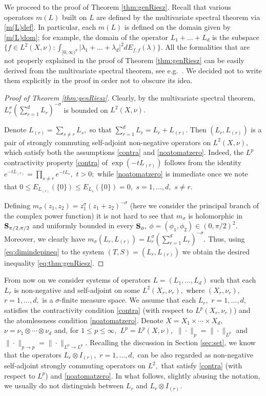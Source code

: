 \documentclass[leqno,12pt]{amsart}
\theoremstyle{definition}
\theoremstyle{remark}
\begin{document}
        We proceed to the proof of Theorem \ref{thm:genRiesz}. Recall that various operators $m(L)$ built on $L$ are defined by the multivariate spectral theorem via \eqref{m(L)def}. In particular, each $m(L)$ is defined on the domain given by \eqref{m(L)dom}; for example, the domain of the operator $L_1+\ldots +L_d$ is the subspace
         $\{f\in L^2(X,\nu)\colon \int_{[0,\infty)^d}|{\lambda}_1+\ldots+{\lambda}_d|^2 dE_{f,f}({\lambda})\}.$
         All the formalities that are not properly explained in the proof of Theorem \ref{thm:genRiesz} can be easily derived from the multivariate spectral theorem, see e.g.\ \cite[Theorem 4.16]{schmu:dgen}. We decided not to write them explicitly in the proof in order not to obscure its idea.
        \begin{proof}[Proof of Theorem \ref{thm:genRiesz}]
        Clearly, by the multivariate spectral theorem, $L_r^{\sigma}(\sum_{r=1}^d L_r)^{-\sigma}$ is bounded on $L^2(X,\nu).$

        Denote $L_{(r)}=\sum_{s\neq r} L_s,$ so that $\sum_{r=1}^d L_r=L_r+L_{(r)}.$ Then $(L_r,L_{(r)})$ is a pair of strongly commuting self-adjoint non-negative operators on $L^2(X,\nu),$ which satisfy both the assumptions \eqref{contra} and \eqref{noatomatzero}. Indeed, the $L^p$ contractivity property \eqref{contra} of $\exp(-tL_{(r)})$ follows from the identity $e^{-tL_{(r)}}=\prod_{s\neq r}e^{-t L_{s}},$ $t>0;$ while \eqref{noatomatzero} is immediate once we note that $0\leq E_{L_{(r)}}(\{0\})\leq E_{L_s}(\{0\})=0,$ $s=1,\ldots,d,$ $s\neq r.$

         Defining $m_{\sigma}(z_1,z_2)=z_1^{\sigma}(z_1+z_2)^{-\sigma}$ (here we consider the principal branch of the complex power function) it is not hard to see that $m_{\sigma}$ is holomorphic in ${\bf S}_{\pi/2,\pi/2}$ and uniformly bounded in every ${\bf S}_{\phi},$ $\phi=(\phi_1,\phi_2)\in(0,\pi/2)^2.$ Moreover, we clearly have
         $m_{\sigma}(L_r,L_{(r)})=L_r^{\sigma}(\sum_{r=1}^d L_r)^{-\sigma}.$ Thus, using \eqref{eq:dimindepineq} to the system $(T,S)=(L_r,L_{(r)})$ we obtain the desired inequality \eqref{eq:thm:genRiesz}.
        \end{proof}

        From now on we consider systems of operators $L=(L_1,\ldots,L_d)$ such that each $L_r$ is non-negative and self-adjoint on some $L^2(X_r,\nu_r),$ where $(X_r,\nu_r),$ $r=1,\ldots,d,$ is a $\sigma$-finite measure space. We assume that each $L_r,$ $r=1,\ldots,d,$ satisfies the contractivity condition \eqref{contra} (with respect to $L^p(X_r,\nu_r)$) and the atomlessness condition \eqref{noatomatzero}. Denote $X=X_1\times\cdots\times X_d,$ $\nu=\nu_1\otimes\cdots\otimes \nu_d$ and, for $1\leq p\leq \infty,$ $L^p=L^p(X,\nu),$ $\|\cdot\|_p=\|\cdot\|_{L^p}$ and $\|\cdot\|_{p\to p}=\|\cdot\|_{L^p\to L^p}.$
        Recalling the discussion in Section \ref{sec:set}, we know that the operators $L_r\otimes I_{(r)},$ $r=1,\ldots,d,$ can be also regarded as non-negative self-adjoint strongly commuting operators on $L^2,$ that satisfy \eqref{contra} (with respect to $L^p$) and \eqref{noatomatzero}. In what follows, slightly abusing the notation, we usually do not distinguish between $L_r$ and $L_r\otimes I_{(r)}.$
\end{document}
